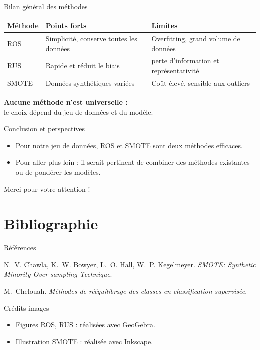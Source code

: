 \documentclass{beamer}
\begin{document}
\begin{frame}{Bilan général des méthodes}
    \centering
    \small
    \begin{tabular}{|l|p{3cm}|p{3cm}|}
        \hline
        \centering
        \textbf{Méthode} & \textbf{Points forts} & \textbf{Limites} \\
        \hline
        \centering
        ROS & Simplicité, conserve toutes les données & Overfitting, grand volume de données \\
        \hline
        \centering
        RUS & Rapide et réduit le biais & perte d'information et représentativité \\
        \hline
        \centering
        SMOTE & Données synthétiques variées & Coût élevé, sensible aux outliers \\
        \hline
    \end{tabular}
    \vspace{0.7cm}

    \textbf{Aucune méthode n’est universelle :}\\
    le choix dépend du jeu de données et du modèle.
\end{frame}

\begin{frame}{Conclusion et perspectives}
    \begin{itemize}
        \item Pour notre jeu de données, ROS et SMOTE sont deux méthodes efficaces.\\[0.5cm]
        \item Pour aller plus loin : il serait pertinent de combiner des méthodes existantes ou de pondérer les modèles.
    \end{itemize}
\end{frame}

\begin{frame}
    \centering
    \Huge Merci pour votre attention !
\end{frame}

\section{Bibliographie}

\begin{frame}[allowframebreaks]{Références}
    \small
    \begin{thebibliography}{9}

    N.~V. Chawla, K.~W. Bowyer, L.~O. Hall, W.~P. Kegelmeyer.
    \newblock \emph{SMOTE: Synthetic Minority Over-sampling Technique}.

    M.~Chelouah.
    \newblock \emph{Méthodes de rééquilibrage des classes en classification supervisée}.

    \end{thebibliography}
    \end{frame}

    \begin{frame}{Crédits images}
      \small
      \begin{itemize}
        \item Figures ROS, RUS : réalisées avec GeoGebra.
        \item Illustration SMOTE : réalisée avec Inkscape.
      \end{itemize}
    \end{frame}
\end{document}
